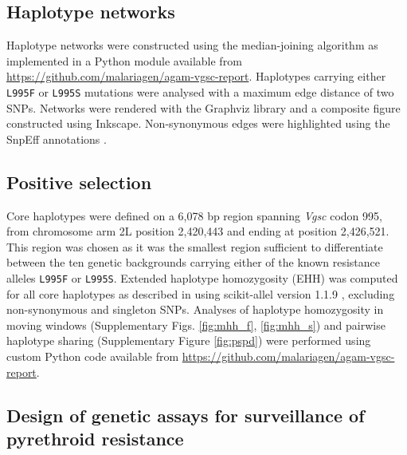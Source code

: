 \documentclass[a4paper,11pt,abstracton,hidelinks]{scrartcl}
\begin{document}
\subsection*{Haplotype networks}

%
Haplotype networks were constructed using the median-joining algorithm \cite{Bandelt1999} as implemented in a Python module available from \url{https://github.com/malariagen/agam-vgsc-report}.
%
Haplotypes carrying either \texttt{L995F} or \texttt{L995S} mutations were analysed with a maximum edge distance of two SNPs.
%
Networks were rendered with the Graphviz library and a composite figure constructed using Inkscape.
%
Non-synonymous edges were highlighted using the SnpEff annotations \cite{Cingolani2012}.


\subsection*{Positive selection}

Core haplotypes were defined on a 6,078 bp region spanning \textit{Vgsc} codon 995, from chromosome arm 2L position 2,420,443 and ending at position 2,426,521.
%
This region was chosen as it was the smallest region sufficient to differentiate between the ten genetic backgrounds carrying either of the known resistance alleles \texttt{L995F} or \texttt{L995S}.
%
Extended haplotype homozygosity (EHH) was computed for all core haplotypes as described in \cite{Sabeti2002} using scikit-allel version 1.1.9 \cite{Miles2016}, excluding non-synonymous and singleton SNPs.
%
Analyses of haplotype homozygosity in moving windows (Supplementary Figs. \ref{fig:mhh_f}, \ref{fig:mhh_s}) and pairwise haplotype sharing (Supplementary Figure \ref{fig:pspd}) were performed using custom Python code available from \url{https://github.com/malariagen/agam-vgsc-report}.
%

\subsection*{Design of genetic assays for surveillance of pyrethroid resistance}
\end{document}
